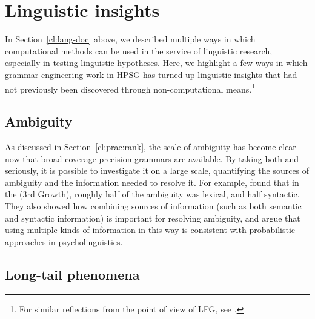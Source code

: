 \documentclass[output=paper
	        ,collection
	        ,collectionchapter
 	        ,biblatex
                ,babelshorthands
                ,newtxmath
                ,draftmode
                ,colorlinks, citecolor=brown
]{langscibook}
\begin{document}


\section{Linguistic insights}
\label{cl:insight}

In Section~\ref{cl:lang-doc} above, we described multiple ways in which computational methods can be used in the service of linguistic research, especially in testing linguistic hypotheses. Here, we highlight a few ways in which grammar engineering work in HPSG has turned up linguistic insights that had not previously been discovered through non-computational means.\footnote{For similar reflections from the point of view of LFG, see \cite{King:16}.}

\subsection{Ambiguity} %

As discussed in Section~\ref{cl:prac:rank},
the scale of ambiguity has become clear now that
broad-coverage precision grammars are available. 
By taking both  and  seriously,
it is possible to investigate it on a large scale,
quantifying the sources of ambiguity and the information needed to resolve it.
For example, \citet{Tou:Man:Shi:Fli:Oep:02,Tou:Man:Fli:Oep:05}
found that in the   (3rd Growth),
roughly half of the ambiguity was lexical, and half syntactic.
They also showed how combining sources of information
(such as both semantic and syntactic information)
is important for resolving ambiguity,
and argue that using multiple kinds of information in this way
is consistent with probabilistic approaches in psycholinguistics.

\subsection{Long-tail phenomena} %
\end{document}
